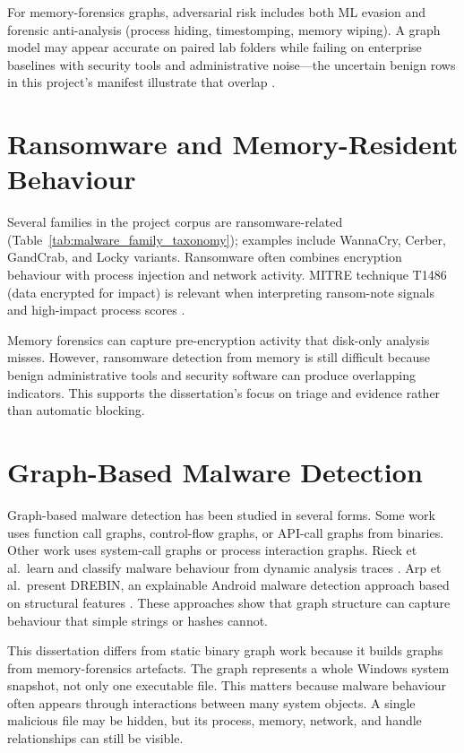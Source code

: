 For memory-forensics graphs, adversarial risk includes both ML evasion and forensic anti-analysis (process hiding, timestomping, memory wiping). A graph model may appear accurate on paired lab folders while failing on enterprise baselines with security tools and administrative noise---the uncertain benign rows in this project's manifest illustrate that overlap \cite{zhan2022graphmalwaresurvey}.

\section{Ransomware and Memory-Resident Behaviour}

Several families in the project corpus are ransomware-related (Table~\ref{tab:malware_family_taxonomy}); examples include WannaCry, Cerber, GandCrab, and Locky variants. Ransomware often combines encryption behaviour with process injection and network activity. MITRE technique T1486 (data encrypted for impact) is relevant when interpreting ransom-note signals and high-impact process scores \cite{mitre2026t1486}.

Memory forensics can capture pre-encryption activity that disk-only analysis misses. However, ransomware detection from memory is still difficult because benign administrative tools and security software can produce overlapping indicators. This supports the dissertation's focus on triage and evidence rather than automatic blocking.

\section{Graph-Based Malware Detection}

Graph-based malware detection has been studied in several forms. Some work uses function call graphs, control-flow graphs, or API-call graphs from binaries. Other work uses system-call graphs or process interaction graphs. Rieck et al.\ learn and classify malware behaviour from dynamic analysis traces \cite{rieck2008learning}. Arp et al.\ present DREBIN, an explainable Android malware detection approach based on structural features \cite{arp2014drebin}. These approaches show that graph structure can capture behaviour that simple strings or hashes cannot.

This dissertation differs from static binary graph work because it builds graphs from memory-forensics artefacts. The graph represents a whole Windows system snapshot, not only one executable file. This matters because malware behaviour often appears through interactions between many system objects. A single malicious file may be hidden, but its process, memory, network, and handle relationships can still be visible.

